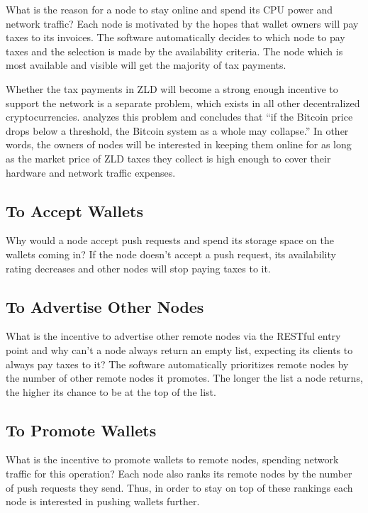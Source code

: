 \documentclass{main}
\begin{document}
What is the reason for a node to stay online and spend its CPU power
and network traffic? Each node is motivated by the
hopes that wallet owners will pay taxes to its invoices. The software
automatically decides to which node to pay taxes and the selection is
made by the availability criteria. The node which is most available
and visible will get the majority of tax payments.

Whether the tax payments in ZLD will become a strong enough incentive
to support the network is a separate problem, which exists in all
other decentralized cryptocurrencies. \textcite{iwamura2014} analyzes this
problem and concludes that ``if the Bitcoin price drops below
a threshold, the Bitcoin system as a whole may collapse.'' In other words,
the owners of nodes will be interested in keeping them online for as long
as the market price of ZLD taxes they collect is high enough to cover
their hardware and network traffic expenses.

\subsection{To Accept Wallets}

Why would a node accept push requests and spend its storage space
on the wallets coming in? If the node doesn't accept a push request,
its availability rating decreases and other nodes will stop paying
taxes to it.

\subsection{To Advertise Other Nodes}

What is the incentive to advertise other remote nodes via the  RESTful
entry point and why can't a node always return an empty list, expecting its clients
to always pay taxes to it? The software automatically prioritizes remote
nodes by the number of other remote nodes it promotes. The longer the list a node
returns, the higher its chance to be at the top of the list.

\subsection{To Promote Wallets}

What is the incentive to promote wallets to remote nodes, spending network
traffic for this operation? Each node also ranks its remote nodes by the
number of push requests they send. Thus, in order to stay on top of these rankings
each node is interested in pushing wallets further.
\end{document}
